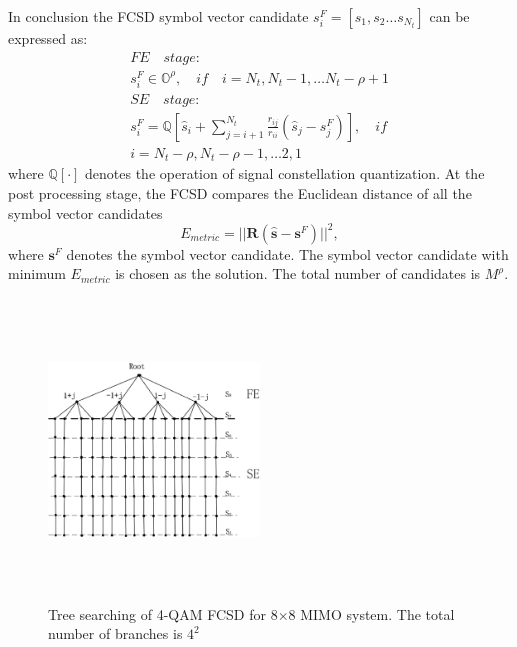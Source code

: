 \documentclass[letterpaper, 10pt, conference,twoside]{ieeeconf}
\begin{document}
In conclusion the FCSD symbol vector candidate $s^{F}_{i}=[s_{1},s_{2}\dots s_{N_{t}}]$ can be expressed as:
\begin{equation}
\begin{split}
&FE \quad stage:\\
&{s}_{i}^{F}\in    \mathbb{O}^{\rho},  \quad if\quad i=N_{t},N_{t}-1,\dots N_{t}-\rho+1\\
& SE\quad stage:\\
&{s}_{i}^{F}=\mathbb{Q}[\hat{s}_{i}+\sum_{j=i+1}^{N_{t}}\frac{r_{ij}}{r_{ii}}(\hat{s}_{j}-s_{j}^{F})], \quad if\quad \\
& i = N_{t}-\rho,N_{t}-\rho-1,\dots 2,1 
  \label{FCSD solution}
\end{split}
\end{equation}
where $\mathbb{Q}[\cdot]$ denotes the operation of signal constellation quantization. At the post processing stage, the FCSD compares the Euclidean distance of all the symbol vector candidates
\begin{equation}
E_{metric}=||\mathbf{R}(\mathbf{\hat{s}}-\mathbf{s}^{F})||^{2},
\end{equation} 
where $\mathbf{s}^{F}$ denotes the symbol vector candidate. The symbol vector candidate with minimum $E_{metric}$ is chosen as the solution. The total number of candidates is $M^{\rho}$.  
\begin{figure}[htb]
\centering
\includegraphics[width=0.5\textwidth, height=8cm]{FCSD_tree_searching.eps}
\caption{Tree searching of 4-QAM FCSD for 8$\times$8 MIMO system. The total number of branches is $4^{2}$}
\label{figure4}
\end{figure}
\end{document}
